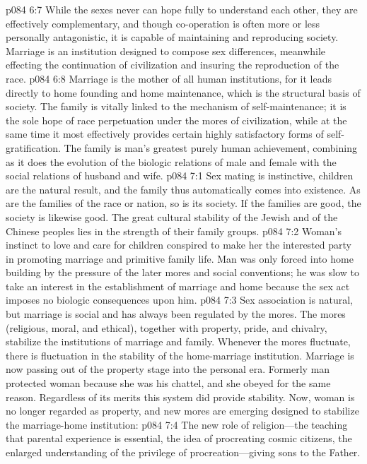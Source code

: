 \pc \vs p084 6:7 While the sexes never can hope fully to understand each other, they are effectively complementary, and though co\hyp{}operation is often more or less personally antagonistic, it is capable of maintaining and reproducing society. Marriage is an institution designed to compose sex differences, meanwhile effecting the continuation of civilization and insuring the reproduction of the race.\plusone
\vs p084 6:8 Marriage is the mother of all human institutions, for it leads directly to home founding and home maintenance, which is the structural basis of society. The family is vitally linked to the mechanism of self\hyp{}maintenance; it is the sole hope of race perpetuation under the mores of civilization, while at the same time it most effectively provides certain highly satisfactory forms of self\hyp{}gratification. The family is man’s greatest purely human achievement, combining as it does the evolution of the biologic relations of male and female with the social relations of husband and wife.
\vs p084 7:1 Sex mating is instinctive, children are the natural result, and the family thus automatically comes into existence. As are the families of the race or nation, so is its society. If the families are good, the society is likewise good. The great cultural stability of the Jewish and of the Chinese peoples lies in the strength of their family groups.
\vs p084 7:2 Woman’s instinct to love and care for children conspired to make her the interested party in promoting marriage and primitive family life. Man was only forced into home building by the pressure of the later mores and social conventions; he was slow to take an interest in the establishment of marriage and home because the sex act imposes no biologic consequences upon him.
\vs p084 7:3 Sex association is natural, but marriage is social and has always been regulated by the mores. The mores (religious, moral, and ethical), together with property, pride, and chivalry, stabilize the institutions of marriage and family. Whenever the mores fluctuate, there is fluctuation in the stability of the home\hyp{}marriage institution. Marriage is now passing out of the property stage into the personal era. Formerly man protected woman because she was his chattel, and she obeyed for the same reason. Regardless of its merits this system did provide stability. Now, woman is no longer regarded as property, and new mores are emerging designed to stabilize the marriage\hyp{}home institution:
\pc \vs p084 7:4 \bibnobreakspace The new role of religion---the teaching that parental experience is essential, the idea of procreating cosmic citizens, the enlarged understanding of the privilege of procreation---giving sons to the Father.
